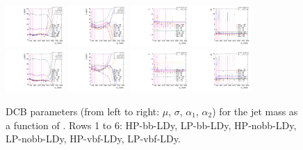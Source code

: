 \begin{figure}[htbp]
  \includegraphics[width=0.2\textwidth]{fig/2Dfit/paramSignalShape_allSig_MJJ_HP_vbf_LDy_mean.pdf}
  \includegraphics[width=0.2\textwidth]{fig/2Dfit/paramSignalShape_allSig_MJJ_HP_vbf_LDy_sigma.pdf}
  \includegraphics[width=0.2\textwidth]{fig/2Dfit/paramSignalShape_allSig_MJJ_HP_vbf_LDy_alpha.pdf}
  \includegraphics[width=0.2\textwidth]{fig/2Dfit/paramSignalShape_allSig_MJJ_HP_vbf_LDy_alpha2.pdf}\\
  \includegraphics[width=0.2\textwidth]{fig/2Dfit/paramSignalShape_allSig_MJJ_LP_vbf_LDy_mean.pdf}
  \includegraphics[width=0.2\textwidth]{fig/2Dfit/paramSignalShape_allSig_MJJ_LP_vbf_LDy_sigma.pdf}
  \includegraphics[width=0.2\textwidth]{fig/2Dfit/paramSignalShape_allSig_MJJ_LP_vbf_LDy_alpha.pdf}
  \includegraphics[width=0.2\textwidth]{fig/2Dfit/paramSignalShape_allSig_MJJ_LP_vbf_LDy_alpha2.pdf}\\
  \caption{
    DCB parameters (from left to right: $\mu$, $\sigma$, $\alpha_1$, $\alpha_2$) for the jet mass \MJ as a function of \MX.
    Rows 1 to 6: HP-bb-LDy, LP-bb-LDy, HP-nobb-LDy, LP-nobb-LDy, HP-vbf-LDy, LP-vbf-LDy.
  }
  \label{fig:MJJShapeParam_LDy_Run2}
\end{figure}

